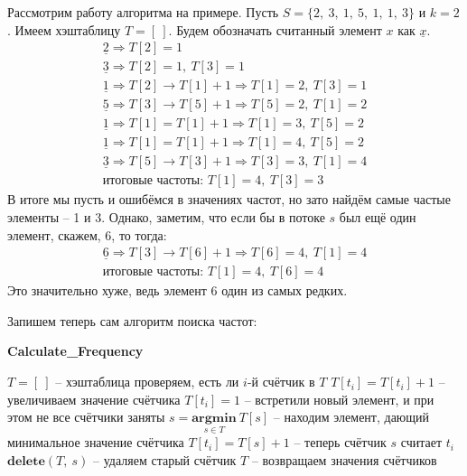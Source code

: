 \documentclass[a4paper,12pt]{article}
\begin{document}
Рассмотрим работу алгоритма на примере. Пусть $S = \{2,\ 3,\ 1,\ 5,\ 1,\ 1,\ 3\}$ и $k = 2$. Имеем хэштаблицу $T = [\ ]$. Будем обозначать считанный элемент $x$ как $\underline{x}$.
\begin{gather*}
    \underline{2} \Rightarrow T[2] = 1\\
    \underline{3} \Rightarrow T[2] = 1,\ T[3] = 1\\
    \underline{1} \Rightarrow T[2] \to T[1] + 1 \Rightarrow T[1] = 2,\ T[3] = 1\\
    \underline{5} \Rightarrow T[3] \to T[5] + 1 \Rightarrow T[5] = 2,\ T[1] = 2\\
    \underline{1} \Rightarrow T[1] = T[1] + 1 \Rightarrow T[1] = 3,\ T[5] = 2\\
    \underline{1} \Rightarrow T[1] = T[1] + 1 \Rightarrow T[1] = 4,\ T[5] = 2\\
    \underline{3} \Rightarrow T[5] \to T[3] + 1 \Rightarrow T[3] = 3,\ T[1] = 4\\
    \text{итоговые частоты: } T[1] = 4,\ T[3] = 3
\end{gather*}
В итоге мы пусть и ошибёмся в значениях частот, но зато найдём самые частые элементы -- 1 и 3. Однако, заметим, что если бы в потоке $s$ был ещё один элемент, скажем, 6, то тогда:
\begin{gather*}
    \underline{6} \Rightarrow T[3] \to T[6] + 1 \Rightarrow T[6] = 4,\ T[1] = 4\\
    \text{итоговые частоты: } T[1] = 4,\ T[6] = 4
\end{gather*}
Это значительно хуже, ведь элемент 6 один из самых редких.

Запишем теперь сам алгоритм поиска частот:

\begin{algorithm}[H]
    \caption{\textbf{Calculate\_Frequency}}
    \begin{algorithmic}[1]
        \Statex
            \State $T = [\ ]$ -- хэштаблица
                \State проверяем, есть ли $i$-й счётчик в $T$
                    \State $T[t_i] = T[t_i] + 1$ -- увеличиваем значение счётчика
                    \State $T[t_i] = 1$ -- встретили новый элемент, и при этом не все счётчики заняты
                \Else
                    \State $s = \underset{s \in T}{\textbf{argmin}}\ T[s]$ -- находим элемент, дающий минимальное значение счётчика
                    \State $T[t_i] = T[s] + 1$ -- теперь счётчик $s$ считает $t_i$
                    \State $\textbf{delete}(T,\ s)$ -- удаляем старый счётчик
                \EndIf
            \EndFor
        \State \Return $T$ -- возвращаем значения счётчиков
    \end{algorithmic}
\end{algorithm}
\end{document}
